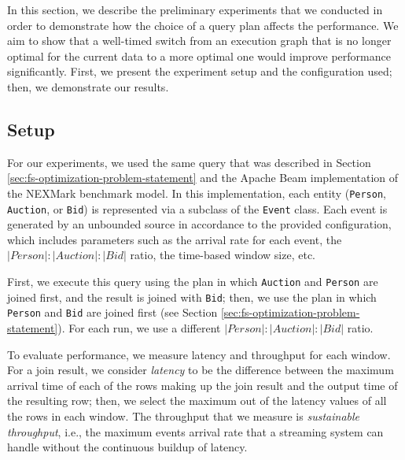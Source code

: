 \label {sec:fs-optimization-experiments}
In this section, we describe the preliminary experiments that we conducted in order to demonstrate how the choice of a query plan affects the performance. We aim to show that a well-timed switch from an execution graph that is no longer optimal for the current data to a more optimal one would improve performance significantly. First, we present the experiment setup and the configuration used; then, we demonstrate our results. 
\subsection{Setup}

For our experiments, we used the same query that was described in Section \ref{sec:fs-optimization-problem-statement} and the Apache Beam implementation of the NEXMark benchmark model. In this implementation, each entity (\texttt{Person}, \texttt{Auction}, or \texttt{Bid}) is represented via a subclass of the \texttt{Event} class. Each event is generated by an unbounded source in accordance to the provided configuration, which includes parameters such as the arrival rate for each event, the $|Person|:|Auction|:|Bid|$ ratio, the time-based window size, etc. 

First, we execute this query using the plan in which \texttt{Auction} and \texttt{Person} are joined first, and the result is joined with \texttt{Bid}; then, we use the plan in which \texttt{Person} and \texttt{Bid} are joined first (see Section  \ref{sec:fs-optimization-problem-statement}). For each run, we use a different $|Person|:|Auction|:|Bid|$ ratio.

To evaluate performance, we measure latency and throughput for each window. For a join result, we consider \textit{latency} to be the difference between the maximum arrival time of each of the rows making up the join result and the output time of the resulting row; then, we select the maximum out of the latency values of all the rows in each window. The throughput that we measure is \textit{sustainable throughput}, i.e., the maximum events arrival rate that a streaming system can handle without the continuous buildup of latency.

